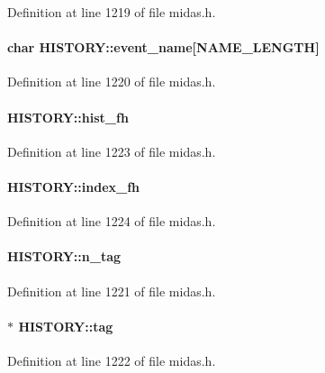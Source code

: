 Definition at line 1219 of file midas.h.
\paragraph[{event\_\-name}]{\setlength{\rightskip}{0pt plus 5cm}char {\bf HISTORY::event\_\-name}\mbox{[}NAME\_\-LENGTH\mbox{]}}\hfill\label{structHISTORY_aa1eb8e97074d13d85926b4c12eff22f4}


Definition at line 1220 of file midas.h.
\paragraph[{hist\_\-fh}]{ {\bf HISTORY::hist\_\-fh}}\hfill\label{structHISTORY_a79a69e6f7ee9000ef228992c63fa1b17}


Definition at line 1223 of file midas.h.
\paragraph[{index\_\-fh}]{ {\bf HISTORY::index\_\-fh}}\hfill\label{structHISTORY_a09233da06a1c7e441bd32f6230e80657}


Definition at line 1224 of file midas.h.
\paragraph[{n\_\-tag}]{ {\bf HISTORY::n\_\-tag}}\hfill\label{structHISTORY_aa4e80312dae8b75b2c05c697e6ee5951}


Definition at line 1221 of file midas.h.
\paragraph[{tag}]{$\ast$ {\bf HISTORY::tag}}\hfill\label{structHISTORY_abef679759fcdaa44b47213a6ad972a77}


Definition at line 1222 of file midas.h.